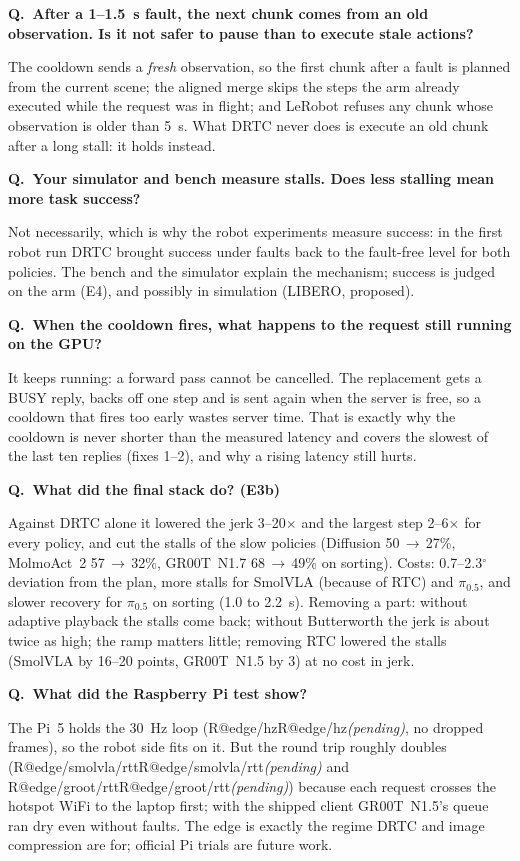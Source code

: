 \documentclass[11pt,a4paper]{article}
\makeatletter
\newcommand{\R}[1]{\ifcsname R@#1\endcsname\csname R@#1\endcsname\else\pending\fi}
\newcommand{\pending}{\textit{\color{warn}(pending)}}
\newcommand{\drtc}{DRTC}
\newcommand{\smolvla}{SmolVLA}
\newcommand{\groot}{GR00T~N1.5}
\newcommand{\pizerofive}{$\pi_{0.5}$}
\newcommand{\degree}{$^\circ$}
\newcounter{qn}
\newcommand{\q}[2]{\stepcounter{qn}\par\medskip
  {\bfseries\color{accent}Q\theqn.\ #1}\par\nopagebreak[4]#2\par}
\makeatother
\begin{document}
\q{After a 1--1.5~s fault, the next chunk comes from an old observation. Is it not safer to pause than to execute
stale actions?}{The cooldown sends a \emph{fresh} observation, so the first chunk after a fault is planned from the
current scene; the aligned merge skips the steps the arm already executed while the request was in flight; and LeRobot
refuses any chunk whose observation is older than 5~s. What \drtc{} never does is execute an old chunk after a long
stall: it holds instead.}

\q{Your simulator and bench measure stalls. Does less stalling mean more task success?}{Not necessarily, which is why
the robot experiments measure success: in the first robot run \drtc{} brought success under faults back to the
fault-free level for both policies. The bench and the simulator explain the mechanism; success is judged on the arm
(E4), and possibly in simulation (LIBERO, proposed).}

\q{When the cooldown fires, what happens to the request still running on the GPU?}{It keeps running: a forward pass
cannot be cancelled. The replacement gets a BUSY reply, backs off one step and is sent again when the server is free,
so a cooldown that fires too early wastes server time. That is exactly why the cooldown is never shorter than the
measured latency and covers the slowest of the last ten replies (fixes 1--2), and why a rising latency still hurts.}

\q{What did the final stack do? (E3b)}{Against \drtc{} alone it lowered the jerk 3--20$\times$ and the largest step
2--6$\times$ for every policy, and cut the stalls of the slow policies (Diffusion 50\,$\to$\,27\%, MolmoAct~2
57\,$\to$\,32\%, GR00T~N1.7 68\,$\to$\,49\% on sorting). Costs: 0.7--2.3\degree{} deviation from the plan, more stalls for
\smolvla{} (because of RTC) and \pizerofive, and slower recovery for \pizerofive{} on sorting (1.0 to 2.2~s). Removing a part:
without adaptive playback the stalls come back; without Butterworth the jerk is about twice as high; the ramp matters little;
removing RTC lowered the stalls (\smolvla{} by 16--20 points, \groot{} by 3) at no cost in jerk.}

\q{What did the Raspberry Pi test show?}{The Pi~5 holds the 30~Hz loop (\R{edge/hz}, no dropped frames), so the
robot side fits on it. But the round trip roughly doubles (\R{edge/smolvla/rtt} and \R{edge/groot/rtt}) because each
request crosses the hotspot WiFi to the laptop first; with the shipped client \groot's queue ran dry even without
faults. The edge is exactly the regime \drtc{} and image compression are for; official Pi trials are future work.}
\end{document}
